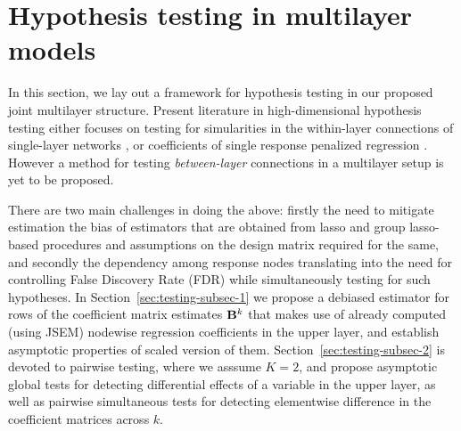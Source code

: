 \section{Hypothesis testing in multilayer models}
In this section, we lay out a framework for hypothesis testing in our proposed joint multilayer structure. Present literature in high-dimensional hypothesis testing either focuses on testing for simularities in the within-layer connections of single-layer networks \citep{CaiLiu16,Liu17}, or coefficients of single response penalized regression \citep{vanDeGeerEtal14,ZhangZhang14,MitraZhang16}. However a method for testing {\it between-layer} connections in a multilayer setup is yet to be proposed.

There are two main challenges in doing the above: firstly the need to mitigate estimation the bias of estimators that are obtained from lasso and group lasso-based procedures and assumptions on the design matrix required for the same, and secondly the dependency among response nodes translating into the need for controlling False Discovery Rate (FDR) while simultaneously testing for such hypotheses. In Section~\ref{sec:testing-subsec-1} we propose a debiased estimator for rows of the coefficient matrix estimates ${\mathbf{B}}^k$ that makes use of already computed (using JSEM) nodewise regression coefficients in the upper layer, and establish asymptotic properties of scaled version of them. Section~\ref{sec:testing-subsec-2} is devoted to pairwise testing, where we asssume $K=2$, and propose asymptotic global tests for detecting differential effects of a variable in the upper layer, as well as pairwise simultaneous tests for detecting elementwise difference in the coefficient matrices across $k$.


